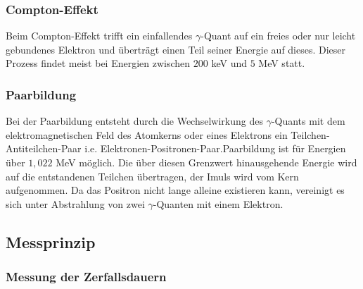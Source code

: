 \documentclass[12pt]{article}
\begin{document}
 \subsubsection{Compton-Effekt}
 Beim Compton-Effekt trifft ein einfallendes $\gamma$-Quant auf ein freies oder nur leicht gebundenes Elektron und überträgt einen Teil seiner Energie auf dieses. Dieser Prozess findet meist bei Energien zwischen $200$ keV und $5$ MeV statt.
 \subsubsection{Paarbildung}
 Bei der Paarbildung entsteht durch die Wechselwirkung des $\gamma$-Quants mit dem elektromagnetischen Feld des Atomkerns oder eines Elektrons ein Teilchen-Antiteilchen-Paar i.e. Elektronen-Positronen-Paar.Paarbildung ist für Energien über $1,022$ MeV möglich. Die über diesen Grenzwert hinausgehende Energie wird auf die entstandenen Teilchen übertragen, der Imuls wird vom Kern aufgenommen. Da das Positron nicht lange alleine existieren kann, vereinigt es sich unter Abstrahlung von zwei $\gamma$-Quanten mit einem Elektron.
 \subsection{Messprinzip}
 \subsubsection{Messung der Zerfallsdauern}
 
\end{document}
